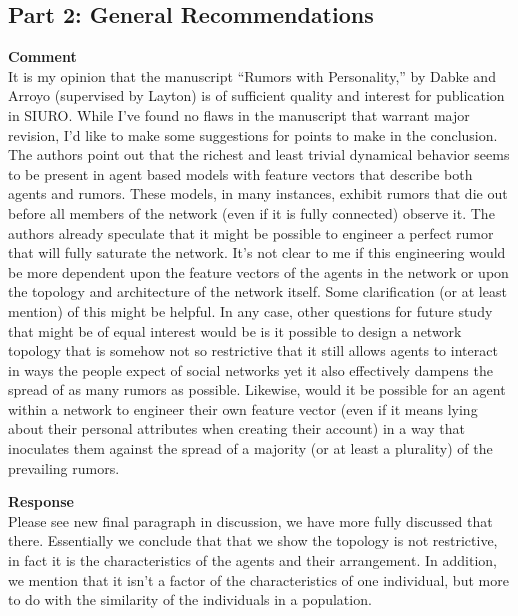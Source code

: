 \subsection{Part 2: General Recommendations}
\textbf{Comment} \\
It is my opinion that the manuscript ``Rumors with Personality,'' by Dabke and Arroyo (supervised by Layton) is of sufficient quality and interest for publication in SIURO.
While I've found no flaws in the manuscript that warrant major revision, I'd like to make some suggestions for points to make in the conclusion.
The authors point out that the richest and least trivial dynamical behavior seems to be present in agent based models with feature vectors that describe both agents and rumors.
These models, in many instances, exhibit rumors that die out before all members of the network (even if it is fully connected) observe it.
The authors already speculate that it might be possible to engineer a perfect rumor that will fully saturate the network.
It's not clear to me if this engineering would be more dependent upon the feature vectors of the agents in the network or upon the topology and architecture of the network itself.
Some clarification (or at least mention) of this might be helpful.
In any case, other questions for future study that might be of equal interest would be is it possible to design a network topology that is somehow not so restrictive that it still allows agents to interact in ways the people expect of social networks yet it also effectively dampens the spread of as many rumors as possible.
Likewise, would it be possible for an agent within a network to engineer their own feature vector (even if it means lying about their personal attributes when creating their account) in a way that inoculates them against the spread of a majority (or at least a plurality) of the prevailing rumors.

\textbf{Response} \\
Please see new final paragraph in discussion, we have more fully discussed that there.
Essentially we conclude that that we show the topology is not restrictive, in fact it is the characteristics of the agents and their arrangement.
In addition, we mention that it isn't a factor of the characteristics of one individual, but more to do with the similarity of the individuals in a population.
